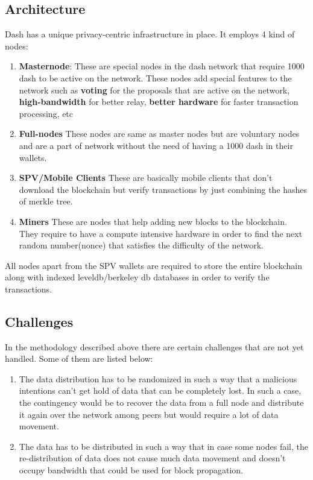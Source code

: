 \documentclass[conference]{IEEEtran}
\begin{document}
\subsection{Architecture}
Dash\cite{dash} has a unique privacy-centric infrastructure in place. It employs
4 kind of nodes:
\begin{enumerate}[label=(\alph*)]
    \item \textbf{Masternode}: These are special nodes in the dash network that
        require 1000 dash to be active on the network. These nodes add special
        features to the network such as \textbf{voting} for the proposals that
        are active on the network, \textbf{high-bandwidth} for better relay,
        \textbf{better hardware} for faster transaction processing, etc
    \item \textbf{Full-nodes} These nodes are same as master nodes but are
        voluntary nodes and are a part of network without the need of having a
        1000 dash in their wallets.
    \item \textbf{SPV/Mobile Clients} These are basically mobile clients that
        don't download the blockchain but verify transactions by just combining
        the hashes of merkle tree.
    \item \textbf{Miners} These are nodes that help adding new blocks to the
        blockchain. They require to have a compute intensive hardware in order
        to find the next random number(nonce) that satisfies the difficulty of
        the network.
\end{enumerate}

All nodes apart from the SPV wallets are required to store the entire blockchain
along with indexed leveldb/berkeley db databases in order to verify the
transactions.  \\

\subsection{Challenges}
In the methodology described above there are certain challenges that are not yet
handled. Some of them are listed below:

\begin{enumerate}
    \item The data distribution has to be randomized in such a way that a
        malicious intentions can't get hold of data that can be completely lost.
        In such a case, the contingency would be to recover the data from a full
        node and distribute it again over the network among peers but would
        require a lot of data movement.
    \item The data has to be distributed in such a way that in case some nodes
        fail, the re-distribution of data does not cause much data movement and
        doesn't occupy bandwidth that could be used for block propagation.
\end{enumerate}
\\
\end{document}
